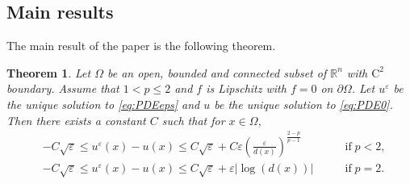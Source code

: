 \documentclass[12pt,reqno]{amsart}
\numberwithin{figure}{section}
\theoremstyle{plain}
\newtheorem{thm}{Theorem}[section]
\theoremstyle{remark}
\numberwithin{equation}{section}
\newcommand{\R}{\mathbb{R}}
\begin{document}
\subsection{Main results} The main result of the paper is the following theorem.


\begin{thm}\label{main_thm1} Let $\Omega$ be an open, bounded and connected subset of $\R^n$ with $\mathrm{C}^2$ boundary. Assume that $1 < p\leq 2$ and $f$ is Lipschitz with $f = 0$ on $\partial\Omega$. Let $u^\varepsilon$ be the unique solution to \eqref{eq:PDEeps} and $u$ be the unique solution to \eqref{eq:PDE0}. Then there exists a constant $C$ such that for $x\in \Omega$,
\begin{align*}
    &-C\sqrt{\varepsilon}\leq  u^\varepsilon(x) - u(x)\leq C\sqrt{\varepsilon} + C\varepsilon \left(\frac{\varepsilon}{d(x)}\right)^{\frac{2-p}{p-1}} &\qquad\text{if}\; p < 2,\\
    &-C\sqrt{\varepsilon}\leq  u^\varepsilon(x) - u(x)\leq C\sqrt{\varepsilon} + \varepsilon|\log(d(x))| &\qquad\text{if}\; p = 2.
\end{align*}
\end{thm}
\end{document}
